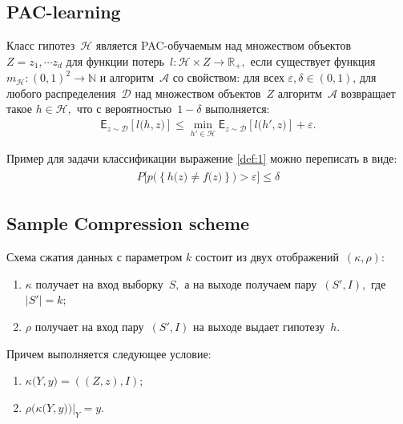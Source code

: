 \documentclass[../main.tex]{subfiles}
\begin{document}
\subsection{PAC-learning}

\begin{definition}
Класс гипотез~$\mathcal{H}$ является PAC-обучаемым над множеством объектов~$Z=z_1, \cdots z_d$ для функции потерь~$l:\mathcal{H}\times Z\to \mathbb{R}_{+},$ если существует функция~$m_{\mathcal{H}}:\left(0,1\right)^2\to \mathbb{N}$ и алгоритм~$\mathcal{A}$ со свойством:
для всех $\varepsilon, \delta \in \left(0,1\right)$, для любого распределения~$\mathcal{D}$ над множеством объектов~$Z$ алгоритм~$\mathcal{A}$ возвращает такое $h\in \mathcal{H},$ что с вероятностью~$1-\delta$ выполняется:
\[
 \label{def:1}
\begin{aligned}
\mathsf{E}_{z\sim \mathcal{D}}\left[l\bigr(h, z\bigr)\right] \leq \min_{h'\in \mathcal{H}} \mathsf{E}_{z\sim \mathcal{D}}\left[l\bigr(h', z\bigr)\right] +\varepsilon.
\end{aligned}
\]
\end{definition}
Пример для задачи классификации выражение \eqref{def:1} можно переписать в виде:
\[
\begin{aligned}
\begin{aligned}
P\bigr[p\bigr(\left\{h\bigr(z\bigr)\not=f\bigr(z\bigr) \right\}\bigr)>\varepsilon\bigr] \leq \delta
\end{aligned}
\end{aligned}
\]

\subsection{Sample Compression scheme}
Схема сжатия данных с параметром $k$ состоит из двух отображений~$\left(\kappa, \rho\right):$
\begin{enumerate}
    \item $\kappa$ получает на вход выборку~$S,$ а на выходе получаем пару~$\left(S', I\right),$ где $|S'|=k$;
    \item $\rho$ получает на вход пару~$\left(S', I\right)$ на выходе выдает гипотезу~$h$.
\end{enumerate}
Причем выполняется следующее условие:
\begin{enumerate}
    \item $\kappa\bigr(Y, y\bigr) = \left(\left(Z, z\right), I\right)$;
    \item $\rho\bigr(\kappa\bigr(Y, y\bigr)\bigr)|_{Y} = y$.
\end{enumerate}
\end{document}
